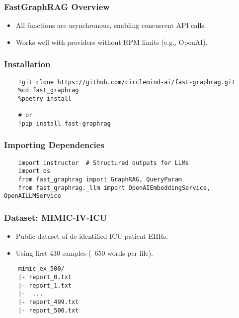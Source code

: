 \begin{frame}[fragile]\frametitle{FastGraphRAG Overview}
    \begin{itemize}
        \item All functions are asynchronous, enabling concurrent API calls.
        \item Works well with providers without RPM limits (e.g., OpenAI).
    \end{itemize}
\end{frame}

\begin{frame}[fragile]\frametitle{Installation}
    \begin{lstlisting}
    !git clone https://github.com/circlemind-ai/fast-graphrag.git
    %cd fast_graphrag
    %poetry install
    
    # or
    !pip install fast-graphrag
    \end{lstlisting}
\end{frame}

\begin{frame}[fragile]\frametitle{Importing Dependencies}
    \begin{lstlisting}
    import instructor  # Structured outputs for LLMs
    import os
    from fast_graphrag import GraphRAG, QueryParam
    from fast_graphrag._llm import OpenAIEmbeddingService, OpenAILLMService
    \end{lstlisting}
\end{frame}

\begin{frame}[fragile]\frametitle{Dataset: MIMIC-IV-ICU}
    \begin{itemize}
        \item Public dataset of de-identified ICU patient EHRs.
        \item Using first 430 samples (~650 words per file).
    \end{itemize}
    \begin{lstlisting}
    mimic_ex_500/
    |- report_0.txt
    |- report_1.txt
    |-  ... 
    |- report_499.txt
    |- report_500.txt
    \end{lstlisting}
\end{frame}

